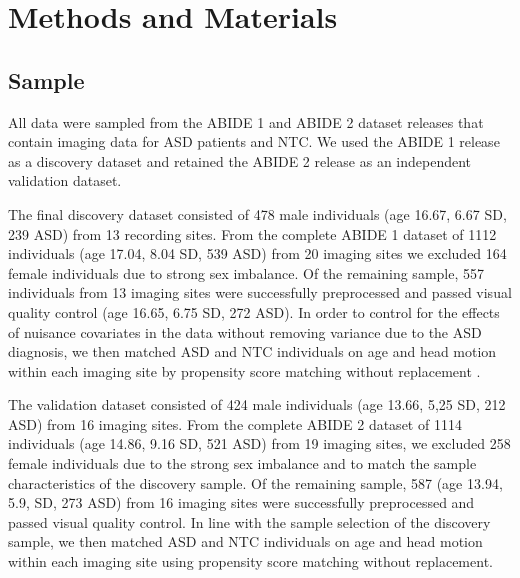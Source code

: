 \documentclass[9pt,lineno]{elife}
\begin{document}
\section{Methods and Materials}
\subsection{Sample}
All data were sampled from the ABIDE 1 \citep{Di_Martino2014-po} and ABIDE 2 \citep{Di_Martino2017-md} dataset releases that contain imaging data for ASD patients and NTC. We used the ABIDE 1 release as a discovery dataset and retained the ABIDE 2 release as an independent validation dataset.

The final discovery dataset consisted of 478 male individuals (age 16.67, 6.67 SD, 239 ASD) from 13 recording sites. From the complete ABIDE 1 dataset of 1112 individuals (age 17.04, 8.04 SD, 539 ASD) from 20 imaging sites we excluded 164 female individuals due to strong sex imbalance. Of the remaining sample, 557 individuals from 13 imaging sites were successfully preprocessed and passed visual quality control (age 16.65, 6.75 SD, 272 ASD). In order to control for the effects of nuisance covariates in the data without removing variance due to the ASD diagnosis, we then matched ASD and NTC individuals on age and head motion within each imaging site by propensity score matching without replacement \citep{Rosenbaum1985-ib}. 

The validation dataset consisted of 424 male individuals (age 13.66, 5,25 SD, 212 ASD) from 16 imaging sites. From the complete ABIDE 2 dataset of 1114 individuals (age 14.86, 9.16 SD, 521 ASD) from 19 imaging sites, we excluded 258 female individuals due to the strong sex imbalance and to match the sample characteristics of the discovery sample. Of the remaining sample, 587 (age 13.94, 5.9, SD, 273 ASD) from 16 imaging sites were successfully preprocessed and passed visual quality control. In line with the sample selection of the discovery sample, we then matched ASD and NTC individuals on age and head motion within each imaging site using propensity score matching without replacement.
\end{document}
